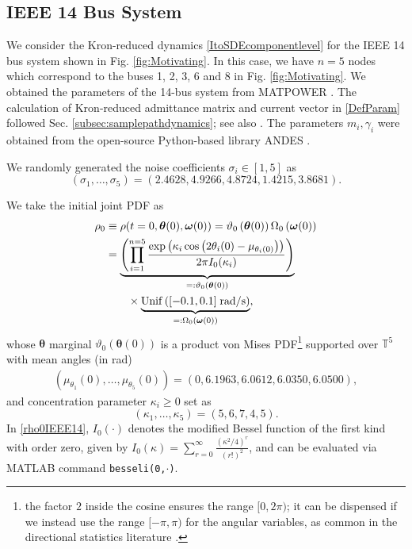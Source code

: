 \documentclass[10pt,twocolumn]{IEEEtran}
\begin{document}
\subsection{IEEE 14 Bus System}\label{subsec:NumSimIEEEBus}
We consider the Kron-reduced dynamics \eqref{ItoSDEcomponentlevel} for the IEEE 14 bus system shown in Fig. \ref{fig:Motivating}. In this case, we have $n=5$ nodes which correspond to the buses 1, 2, 3, 6 and 8 in Fig. \ref{fig:Motivating}. We obtained the parameters of the 14-bus system from MATPOWER \cite{zimmerman2010matpower}. The calculation of Kron-reduced admittance matrix and current vector in \eqref{DefParam} followed Sec.  \ref{subsec:samplepathdynamics}; see also \cite{dorfler2012kron}. The parameters $m_{i}, \gamma_{i}$ were obtained from the open-source Python-based
library ANDES \cite{cui2021andes}.

We randomly generated the noise coefficients $\sigma_{i}\in [1,5]$ as
\[(\sigma_{1},\hdots,\sigma_5) = \left(2.4628, 4.9266, 4.8724, 1.4215, 3.8681\right).\]

We take the initial joint PDF as
\begin{align}
\rho_{0}&\equiv\rho(t=0,\bm{\theta}(0),\bm{\omega}(0)) = \vartheta_{0}\left(\bm{\theta}(0)\right)\Omega_{0}\left(\bm{\omega}(0)\right)\nonumber\\
&=\underbrace{\left(\prod_{i=1}^{n=5}\dfrac{\exp\left(\kappa_{i}\cos\left(2\theta_{i}(0)-\mu_{\theta_{i}(0)}\right)\right)}{2\pi I_{0}(\kappa_{i})}\right)}_{=:\vartheta_{0}\left(\bm{\theta}(0)\right)}\nonumber\\
	&\qquad\times \underbrace{{\rm{Unif}}\left([-0.1,0.1]\;\text{rad/s}\right)}_{=:\Omega_{0}\left(\bm{\omega}(0)\right)},
\label{rho0IEEE14}		
\end{align}
whose $\bm{\theta}$ marginal $ \vartheta_{0}\left(\bm{\theta}(0)\right)$ is a product von Mises PDF\footnote{the factor $2$ inside the cosine ensures the range $[0,2\pi)$; it can be dispensed if we instead use the range $[-\pi,\pi)$ for the angular variables, as common in the directional statistics literature \cite{mardia2009directional}.} \cite{mardia2008multivariate,mardia2014some} supported over $\mathbb{T}^{5}$ with mean angles (in rad)
\begin{align}
\left(\mu_{\theta_{1}}(0),\hdots,\mu_{\theta_{5}}(0)\right)=\left(0, 6.1963, 6.0612, 6.0350, 6.0500\right),
\label{MeanAngleInitialIEEE14}	
\end{align}
and concentration parameter $\kappa_{i}\geq 0$ set as 
\[(\kappa_{1},\hdots,\kappa_5) = \left(5,6,7,4,5\right).\]
In \eqref{rho0IEEE14}, $I_{0}(\cdot)$ denotes the modified Bessel function of the first kind with order zero, given by $I_{0}(\kappa) = \sum_{r=0}^{\infty} \frac{\left(\kappa^{2}/4\right)^{r}}{(r!)^{2}}$, and can be evaluated via MATLAB command \texttt{besseli(0,$\cdot$)}. 
\end{document}
